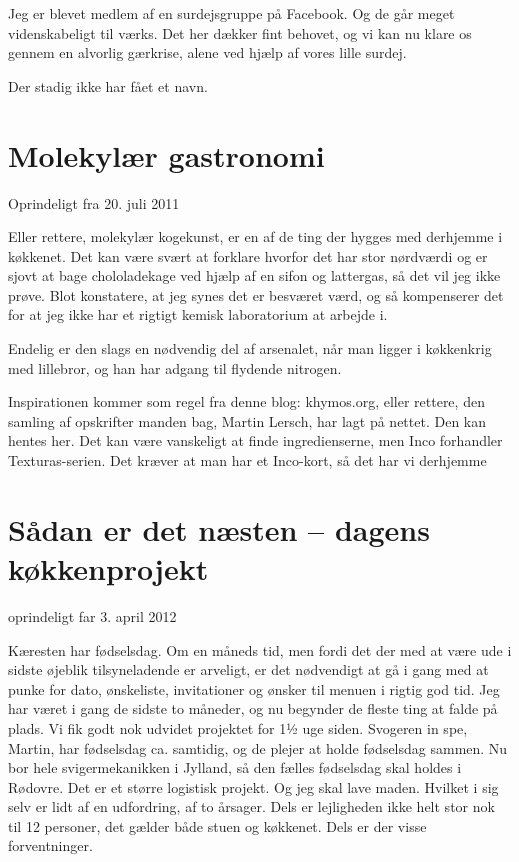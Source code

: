 \documentclass[
]{book}
\begin{document}
Jeg er blevet medlem af en surdejsgruppe på Facebook. Og de går meget videnskabeligt til værks. Det her dækker fint behovet, og vi kan nu klare os gennem en alvorlig gærkrise, alene ved hjælp af vores lille surdej.

Der stadig ikke har fået et navn.

\hypertarget{molekyluxe6r-gastronomi}{%
\section{Molekylær gastronomi}\label{molekyluxe6r-gastronomi}}

Oprindeligt fra 20. juli 2011

Eller rettere, molekylær kogekunst, er en af de ting der hygges med derhjemme i køkkenet. Det kan være svært at forklare hvorfor det har stor nørdværdi og er sjovt at bage chololadekage ved hjælp af en sifon og lattergas, så det vil jeg ikke prøve. Blot konstatere, at jeg synes det er besværet værd, og så kompenserer det for at jeg ikke har et rigtigt kemisk laboratorium at arbejde i.

Endelig er den slags en nødvendig del af arsenalet, når man ligger i køkkenkrig med lillebror, og han har adgang til flydende nitrogen.

Inspirationen kommer som regel fra denne blog: khymos.org, eller rettere, den samling af opskrifter manden bag, Martin Lersch, har lagt på nettet. Den kan hentes her. Det kan være vanskeligt at finde ingredienserne, men Inco forhandler Texturas-serien. Det kræver at man har et Inco-kort, så det har vi derhjemme

\hypertarget{suxe5dan-er-det-nuxe6sten-dagens-kuxf8kkenprojekt}{%
\section{Sådan er det næsten -- dagens køkkenprojekt}\label{suxe5dan-er-det-nuxe6sten-dagens-kuxf8kkenprojekt}}

oprindeligt far 3. april 2012

Kæresten har fødselsdag. Om en måneds tid, men fordi det der med at være ude i sidste øjeblik tilsyneladende er arveligt, er det nødvendigt at gå i gang med at punke for dato, ønskeliste, invitationer og ønsker til menuen i rigtig god tid. Jeg har været i gang de sidste to måneder, og nu begynder de fleste ting at falde på plads. Vi fik godt nok udvidet projektet for 1½ uge siden. Svogeren in spe, Martin, har fødselsdag ca. samtidig, og de plejer at holde fødselsdag sammen. Nu bor hele svigermekanikken i Jylland, så den fælles fødselsdag skal holdes i Rødovre. Det er et større logistisk projekt. Og jeg skal lave maden. Hvilket i sig selv er lidt af en udfordring, af to årsager. Dels er lejligheden ikke helt stor nok til 12 personer, det gælder både stuen og køkkenet. Dels er der visse forventninger.
\end{document}
